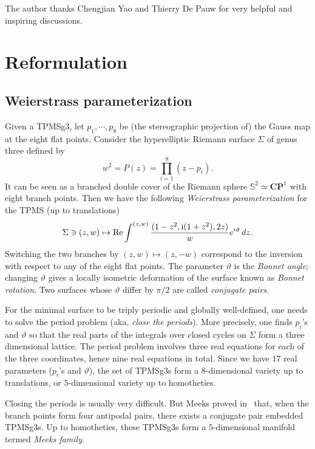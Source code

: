 \documentclass[a4paper]{amsart}
\newcommand{\CP}{\mathbf{CP}}
\newcommand{\uS}{\mathbb{S}}
\newcommand{\re}{\operatorname{Re}}
\newcommand{\ii}{{\rm i}}
\theoremstyle{plain} %
\theoremstyle{definition} %
\theoremstyle{remark}
\begin{document}
The author thanks Chengjian Yao and Thierry De Pauw for very helpful and
inspiring discussions.

\section{Reformulation}

\subsection{Weierstrass parameterization}

Given a TPMSg3, let $p_1, \cdots, p_8$ be (the stereographic projection of) the
Gauss map at the eight flat points.  Consider the hyperelliptic Riemann surface
$\Sigma$ of genus three defined by
\[
	w^2 = P(z) = \prod_{i=1}^8 (z-p_i).
\]
It can be seen as a branched double cover of the Riemann sphere $\uS^2 \simeq
\CP^1$ with eight branch points.  Then we have the following \emph{Weierstrass
parameterization} for the TPMS (up to translations)
\begin{equation}\label{eq:weierstrass}
	\Sigma \ni (z, w) \mapsto \re \int^{(z, w)} \frac{(1-z^2, \ii(1+z^2), 2z)}{w}
	e^{i \vartheta}\, dz.
\end{equation}
Switching the two branches by $(z,w) \mapsto (z,-w)$ correspond to the
inversion with respect to any of the eight flat points.  The parameter
$\vartheta$ is the \emph{Bonnet angle}; changing $\vartheta$ gives a locally
isometric deformation of the surface known as \emph{Bonnet rotation}.  Two
surfaces whose $\vartheta$ differ by $\pi/2$ are called \emph{conjugate pairs}.

For the minimal surface to be triply periodic and globally well-defined, one
needs to solve the period problem (aka, \emph{close the periods}).  More
precisely, one finds $p_i$'s and $\vartheta$ so that the real parts of the
integrals over closed cycles on $\Sigma$ form a three dimensional lattice.  The
period problem involves three real equations for each of the three coordinates,
hence nine real equations in total.  Since we have $17$ real parameters
($p_i$'s and $\vartheta$), the set of TPMSg3s form a $8$-dimensional variety up
to translations, or $5$-dimensional variety up to homotheties.

Closing the periods is usually very difficult.  But Meeks proved
in~\cite{meeks1990} that, when the branch points form four antipodal pairs,
there exists a conjugate pair embedded TPMSg3s.  Up to homotheties, these
TPMSg3s form a $5$-dimensional manifold termed \emph{Meeks family}.
\end{document}
